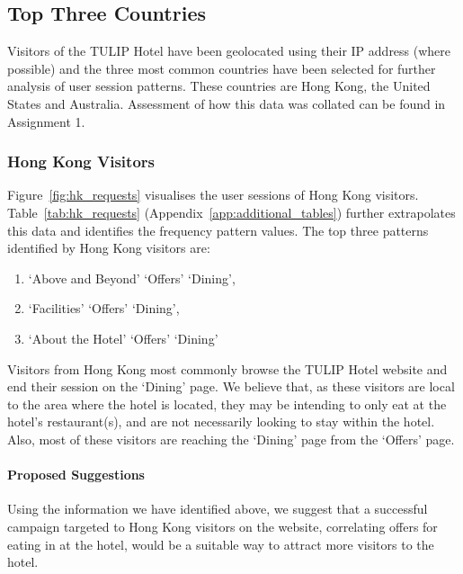 \subsection{Top Three Countries}
\label{sec:results:countries}

Visitors of the TULIP Hotel have been geolocated using their IP address (where possible) and the three most common countries have been selected for further analysis of user session patterns. These countries are Hong Kong, the United States and Australia. Assessment of how this data was collated can be found in Assignment 1.

\subsubsection{Hong Kong Visitors}
\label{sec:results:countries:hk}

Figure~\ref{fig:hk_requests} visualises the user sessions of Hong Kong visitors. Table~\ref{tab:hk_requests}  (Appendix~\ref{app:additional_tables}) further extrapolates this data and identifies the frequency pattern values. The top three patterns identified by Hong Kong visitors are:

\begin{enumerate}
  \item `Above and Beyond' \ra{} `Offers' \ra{} `Dining',
  \item `Facilities' \ra{} `Offers' \ra{} `Dining',
  \item `About the Hotel' \ra{} `Offers' \ra{} `Dining'
\end{enumerate}

Visitors from Hong Kong most commonly browse the TULIP Hotel website and end their session on the `Dining' page. We believe that, as these visitors are local to the area where the hotel is located, they may be intending to only eat at the hotel's restaurant(s), and are not necessarily looking to stay within the hotel. Also, most of these visitors are reaching the `Dining' page from the `Offers' page.

\paragraph{Proposed Suggestions} Using the information we have identified above, we suggest that a successful campaign targeted to Hong Kong visitors on the website, correlating offers for eating in at the hotel, would be a suitable way to attract more visitors to the hotel.



